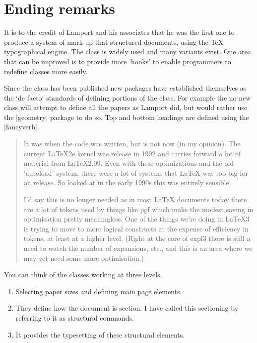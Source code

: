 \section{Ending remarks}

It is to the credit of Lamport and his associates that he was the first one to produce a system of mark-up that structured documents, using the TeX typographical engine. The class is widely used and many variants exist. One area that can be improved is to provide more `hooks' to enable programmers to redefine classes more easily.

Since the class has been published new packages have established themselves as the `de facto` standards of defining portions of the class. For example the no-new class will attempt to define all the papers as Lamport did, but would rather use the |geometry| package to do so. Top and bottom headings are defined using the |fancyverb|. 

\begin{quotation}
It was when the code was written, but is not now (in my opinion). The current LaTeX2e kernel was release in 1992 and carries forward a lot of material from LaTeX2.09. Even with these optimizations and the old 'autoload' system, there were a lot of systems that LaTeX was too big for on release. So looked at in the early 1990s this was entirely sensible.

I'd say this is no longer needed as in most LaTeX documents today there are a lot of tokens used by things like pgf which make the modest saving in optimisation pretty meaningless. One of the things we're doing in LaTeX3 is trying to move to more logical constructs at the expense of efficiency in tokens, at least at a higher level. (Right at the core of expl3 there is still a need to watch the number of expansions, etc., and this is an area where we may yet need some more optimisation.)

\end{quotation}

You can think of the \latex classes working at three levels. 

\begin{enumerate}
\item Selecting paper sizes and defining main page elements.
\item They define how the document is section. I have called this sectioning by referring to it as structural commands.
\item It provides the typesetting of these structural elements.
\end{enumerate}

